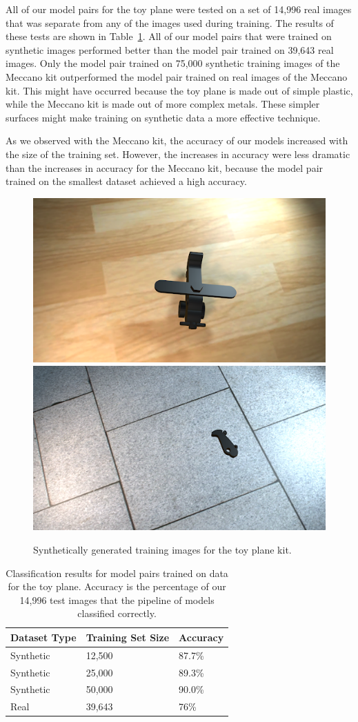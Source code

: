All of our model pairs for the toy plane were tested on a set of 14,996 real
images that was separate from any of the images used during training.
The results of these tests are shown in Table~\ref{tab:plane_accuracy}.
All of our model pairs that were trained on synthetic images performed better
than the model pair trained on 39,643 real images.
Only the model pair trained on 75,000 synthetic training images of the Meccano
kit outperformed the model pair trained on real images of the Meccano kit.
This might have occurred because the toy plane is made out of simple plastic,
while the Meccano kit is made out of more complex metals.
These simpler surfaces might make training on synthetic data a more effective
technique.

As we observed with the Meccano kit, the accuracy of our models increased with
the size of the training set.
However, the increases in accuracy were less dramatic than the increases in
accuracy for the Meccano kit, because the model pair trained on the smallest
dataset achieved a high accuracy.

\begin{figure}
  \includegraphics[width=0.5\columnwidth]{figures/synthetic/plane_train1.png}
  \includegraphics[width=0.5\columnwidth]{figures/synthetic/plane_train2.png}
  \caption{
    Synthetically generated training images for the toy plane kit.
  }\label{fig:plane_train}
\end{figure}

\begin{table}
  \centering
\begin{tabular}{|l||l|l|}
\hline
  Dataset Type & Training Set Size & Accuracy\\
  \hline
  \hline
  Synthetic & 12,500 & 87.7\%\\
  Synthetic & 25,000 & 89.3\%\\
  Synthetic & 50,000 & 90.0\%\\
  \hline
  Real & 39,643 & 76\%\\
\hline
\end{tabular}
  \caption{
    Classification results for model pairs trained on data for the toy plane.
    Accuracy is the percentage of our 14,996 test images that the pipeline of
    models classified correctly.
  }\label{tab:plane_accuracy}
\end{table}

